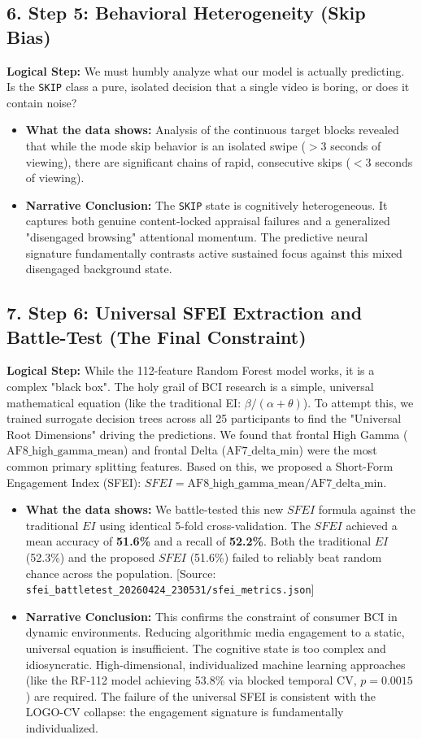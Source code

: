 \documentclass[12pt,a4paper]{report}
\begin{document}
\subsection{6. Step 5: Behavioral Heterogeneity (Skip Bias)}
\textbf{Logical Step:} We must humbly analyze what our model is actually predicting. Is the \texttt{SKIP} class a pure, isolated decision that a single video is boring, or does it contain noise?
\begin{itemize}
    \item \textbf{What the data shows:} Analysis of the continuous target blocks revealed that while the mode skip behavior is an isolated swipe ($>3$ seconds of viewing), there are significant chains of rapid, consecutive skips ($<3$ seconds of viewing).
    \item \textbf{Narrative Conclusion:} The \texttt{SKIP} state is cognitively heterogeneous. It captures both genuine content-locked appraisal failures and a generalized "disengaged browsing" attentional momentum. The predictive neural signature fundamentally contrasts active sustained focus against this mixed disengaged background state.
\end{itemize}

\subsection{7. Step 6: Universal SFEI Extraction and Battle-Test (The Final Constraint)}
\textbf{Logical Step:} While the 112-feature Random Forest model works, it is a complex "black box". The holy grail of BCI research is a simple, universal mathematical equation (like the traditional EI: $\beta / (\alpha + \theta)$). To attempt this, we trained surrogate decision trees across all 25 participants to find the "Universal Root Dimensions" driving the predictions. We found that frontal High Gamma ($\text{AF8\_high\_gamma\_mean}$) and frontal Delta ($\text{AF7\_delta\_min}$) were the most common primary splitting features. Based on this, we proposed a Short-Form Engagement Index (SFEI): $SFEI = \text{AF8\_high\_gamma\_mean} / \text{AF7\_delta\_min}$. 
\begin{itemize}
    \item \textbf{What the data shows:} We battle-tested this new $SFEI$ formula against the traditional $EI$ using identical 5-fold cross-validation. The $SFEI$ achieved a mean accuracy of \textbf{51.6\%} and a recall of \textbf{52.2\%}. Both the traditional $EI$ (52.3\%) and the proposed $SFEI$ (51.6\%) failed to reliably beat random chance across the population. [Source: \verb|sfei_battletest_20260424_230531/sfei_metrics.json|]
    \item \textbf{Narrative Conclusion:} This confirms the constraint of consumer BCI in dynamic environments. Reducing algorithmic media engagement to a static, universal equation is insufficient. The cognitive state is too complex and idiosyncratic. High-dimensional, individualized machine learning approaches (like the RF-112 model achieving 53.8\% via blocked temporal CV, $p=0.0015$) are required. The failure of the universal SFEI is consistent with the LOGO-CV collapse: the engagement signature is fundamentally individualized.
\end{itemize}
\fi
\end{document}
